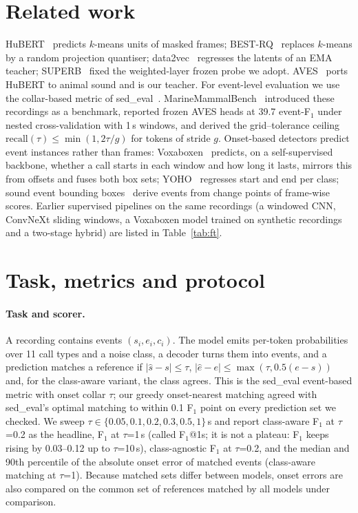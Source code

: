 \documentclass[10pt,twocolumn]{article}
\newcommand{\Fone}{F$_1$}
\begin{document}
\section{Related work}
HuBERT~\citep{hsu2021hubert} predicts $k$-means units of masked frames; BEST-RQ~\citep{chiu2022bestrq} replaces $k$-means by a random projection quantiser; data2vec~\citep{baevski2022data2vec} regresses the latents of an EMA teacher; SUPERB~\citep{yang2021superb} fixed the weighted-layer frozen probe we adopt. AVES~\citep{hagiwara2023aves} ports HuBERT to animal sound and is our teacher. For event-level evaluation we use the collar-based metric of sed\_eval~\citep{mesaros2016metrics}. MarineMammalBench~\citep{sheipak2026mmb} introduced these recordings as a benchmark, reported frozen AVES heads at 39.7 event-\Fone{} under nested cross-validation with 1\,s windows, and derived the grid--tolerance ceiling $\mathrm{recall}(\tau)\le\min(1,2\tau/g)$ for tokens of stride $g$. Onset-based detectors predict event instances rather than frames: Voxaboxen~\citep{mahon2025voxaboxen} predicts, on a self-supervised backbone, whether a call starts in each window and how long it lasts, mirrors this from offsets and fuses both box sets; YOHO~\citep{venkatesh2022yoho} regresses start and end per class; sound event bounding boxes~\citep{ebbers2024sebbs} derive events from change points of frame-wise scores. Earlier supervised pipelines on the same recordings (a windowed CNN, ConvNeXt sliding windows, a Voxaboxen model trained on synthetic recordings and a two-stage hybrid) are listed in Table~\ref{tab:ft}.

\section{Task, metrics and protocol}
\label{sec:metric}
\paragraph{Task and scorer.} A recording contains events $(s_i,e_i,c_i)$. The model emits per-token probabilities over 11 call types and a noise class, a decoder turns them into events, and a prediction matches a reference if $|\hat s-s|\le\tau$, $|\hat e-e|\le\max(\tau,0.5(e-s))$ and, for the class-aware variant, the class agrees. This is the sed\_eval event-based metric with onset collar $\tau$; our greedy onset-nearest matching agreed with sed\_eval's optimal matching to within 0.1 \Fone{} point on every prediction set we checked. We sweep $\tau\in\{0.05,0.1,0.2,0.3,0.5,1\}$\,s and report class-aware \Fone{} at $\tau$=0.2 as the headline, \Fone{} at $\tau$=1\,s (called \Fone{}@1s; it is not a plateau: \Fone{} keeps rising by 0.03--0.12 up to $\tau$=10\,s), class-agnostic \Fone{} at $\tau$=0.2, and the median and 90th percentile of the absolute onset error of matched events (class-aware matching at $\tau$=1). Because matched sets differ between models, onset errors are also compared on the common set of references matched by all models under comparison.
\end{document}
